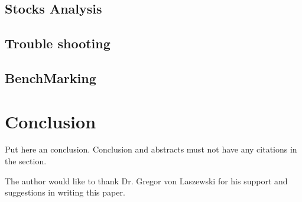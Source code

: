 \subsection{Stocks Analysis}
\subsection{Trouble shooting}
\subsection{BenchMarking}


\section{Conclusion}

Put here an conclusion. Conclusion and abstracts must not have any
citations in the section.


\begin{acks}
The author would like to thank Dr. Gregor von Laszewski for his support and 
suggestions in writing this paper.
\end{acks}






